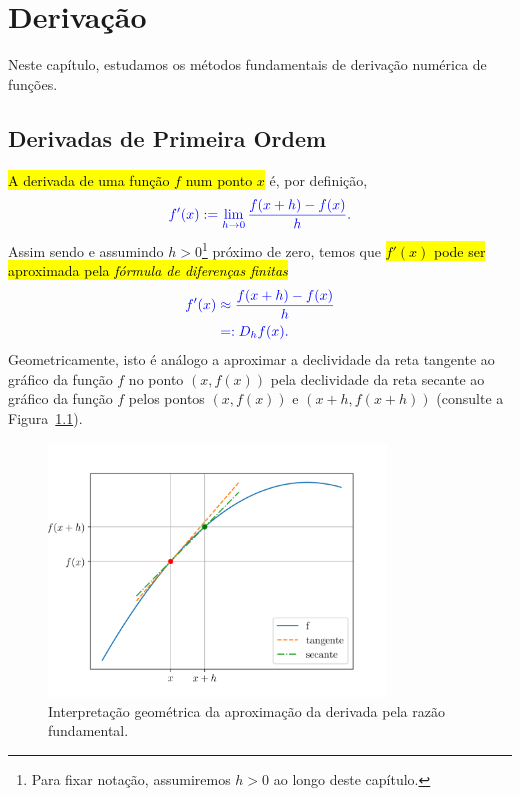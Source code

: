 
\chapter{Derivação}\label{cap_deriv}
\thispagestyle{fancy}

Neste capítulo, estudamos os métodos fundamentais de derivação numérica de funções.

\section{Derivadas de Primeira Ordem}\label{cap_deriv_sec_df}

\hl{A derivada de uma função $f$ num ponto $x$} é, por definição,
\begin{equation}\color{blue}f'(x) := \lim_{h\to 0} \frac{f(x+h) - f(x)}{h}.
\end{equation}
Assim sendo e assumindo $h>0$\footnote{Para fixar notação, assumiremos $h>0$ ao longo deste capítulo.} próximo de zero, temos que \hl{$f'(x)$ pode ser aproximada pela \emph{fórmula de diferenças finitas}}
\begin{subequations}\label{cap_deriv_sec_df:eq:fdf}\hleq
  \begin{align}
    f'(x) &\approx \frac{f(x+h) - f(x)}{h}\\
          &=: D_hf(x).
  \end{align}
\end{subequations}
Geometricamente, isto é análogo a aproximar a declividade da reta tangente ao gráfico da função $f$ no ponto $(x, f(x))$ pela declividade da reta secante ao gráfico da função $f$ pelos pontos $(x, f(x))$ e $(x+h, f(x+h))$ (consulte a Figura~\ref{cap_deriv_sec_df:fig:intro_deriv}).

\begin{figure}[H]
  \centering
  \includegraphics[width=0.8\textwidth]{cap_deriv/dados/fig_intro_deriv/fig}
  \caption{Interpretação geométrica da aproximação da derivada pela razão fundamental.}
  \label{cap_deriv_sec_df:fig:intro_deriv}
\end{figure}

